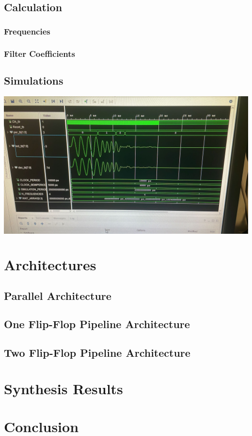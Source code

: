 \documentclass[a4paper, 12pt]{article}
\begin{document}
\subsection{Calculation}
\label{sec:org315bfa7}

\subsubsection{Frequencies}
\label{sec:org036190f}

\subsubsection{Filter Coefficients}
\label{sec:org6e3cad3}
\subsection{Simulations}
\label{sec:org869fb58}

\begin{center}
\includegraphics[width=.9\linewidth]{./img/simulation.jpg}
\end{center}
\section{Architectures}
\label{sec:org3f48db0}

\subsection{Parallel Architecture}
\label{sec:org995ef6a}



\subsection{One Flip-Flop Pipeline Architecture}
\label{sec:org8dc1fed}

\subsection{Two Flip-Flop Pipeline Architecture}
\label{sec:org831450f}
\section{Synthesis Results}
\label{sec:orgcf0f8ea}
\section{Conclusion}
\label{sec:org74c77a1}
\end{document}
